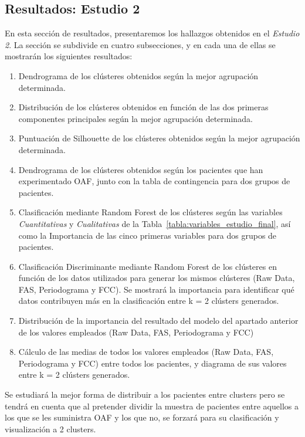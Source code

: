 \subsection{Resultados: Estudio 2}\label{sec:resultados-estudio-1}

En esta sección de resultados, presentaremos los hallazgos obtenidos en el \textit{Estudio 2}. La sección se subdivide en cuatro subsecciones, y en cada una de ellas se mostrarán los siguientes resultados:

\begin{enumerate}
    \item Dendrograma de los clústeres obtenidos según la mejor agrupación determinada.
    \item Distribución de los clústeres obtenidos en función de las dos primeras componentes principales según la mejor agrupación determinada.
    \item Puntuación de Silhouette de los clústeres obtenidos según la mejor agrupación determinada.
    \item Dendrograma de los clústeres obtenidos según los pacientes que han experimentado OAF, junto con la tabla de contingencia para dos grupos de pacientes.
    \item Clasificación mediante Random Forest de los clústeres según las variables \textit{Cuantitativas} y \textit{Cualitativas} de la Tabla~\ref{tabla:variables_estudio_final}, así como la Importancia de las cinco primeras variables para dos grupos de pacientes.
    \item Clasificación Discriminante mediante Random Forest de los clústeres en función de los datos utilizados para generar los mismos clústeres (Raw Data, FAS, Periodograma y FCC). Se mostrará la importancia para identificar qué datos contribuyen más en la clasificación entre k = 2 clústers generados.
    \item Distribución de la importancia del resultado del modelo del apartado anterior de los valores empleados (Raw Data, FAS, Periodograma y FCC) 
    \item Cálculo de las medias de todos los valores empleados (Raw Data, FAS, Periodograma y FCC) entre todos los pacientes, y diagrama de sus valores entre k = 2 clústers generados.
\end{enumerate}

Se estudiará la mejor forma de distribuir a los pacientes entre clusters pero se tendrá en cuenta que al pretender dividir la muestra de pacientes entre aquellos a los que se les suministra  OAF y los que no, se forzará para su clasificación y visualización a 2 clusters.


